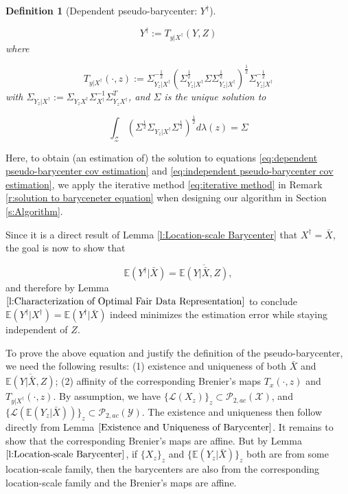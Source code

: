 \documentclass[twoside,11pt]{article}
\newtheorem{defi}{Definition}[section]{\bfseries}{\itshape}
\begin{document}
\begin{defi}[Dependent pseudo-barycenter: $Y^{\dag}$] \label{d:Dependent Pseudo-barycenter}

\begin{equation}\label{eq:dependent pseudo-barycenter }
Y^{\dag} := T_{y|X^{\dagger}}(Y,Z)
\end{equation}
where

\begin{equation}\label{eq:dependent pseudo-barycenter affine map}
T_{y|X^{\dagger}}(\cdot,z) :=  \Sigma_{Y_z|X^{\dagger}}^{-\frac{1}{2}} (\Sigma_{Y_z|X^{\dagger}}^{\frac{1}{2}} \Sigma \Sigma_{Y_z|X^{\dagger}}^{\frac{1}{2}} )^{\frac{1}{2}} \Sigma_{Y_z|X^{\dagger}}^{-\frac{1}{2}}
\end{equation}
with $\Sigma_{Y_z|X^{\dagger}} := \Sigma_{Y_z X^{\dagger}} \Sigma_{X^{\dagger}}^{-1} \Sigma_{Y_z X^{\dagger}}^T$, and $\Sigma$ is the unique solution to

\begin{equation} \label{eq:dependent pseudo-barycenter cov estimation}
\int_{\mathcal{Z}} (\Sigma^{\frac{1}{2}} \Sigma_{Y_z|X^{\dagger}} \Sigma^{\frac{1}{2}})^{\frac{1}{2}} d\lambda(z) = \Sigma
\end{equation}

\end{defi}


Here, to obtain (an estimation of) the solution to equations \eqref{eq:dependent pseudo-barycenter cov estimation} and \eqref{eq:independent pseudo-barycenter cov estimation}, we apply the iterative method \eqref{eq:iterative method} in Remark \ref{r:solution to baryceneter equation} when designing our algorithm in Section \ref{s:Algorithm}.

Since it is a direct result of Lemma \ref{l:Location-scale Barycenter} that $X^{\dag} = \bar{X}$, the goal is now to show that

\begin{equation}
\mathbb{E}(Y^{\dag}|\bar{X}) = \overline{\mathbb{E}(Y|\bar{X},Z)},
\end{equation}
and therefore by Lemma $\ref{l:Characterization of Optimal Fair Data Representation}$ to conclude $\mathbb{E}(Y^{\dag}|X^{\dag}) = \mathbb{E}(Y^{\dag}|\bar{X})$ indeed minimizes the estimation error while staying independent of $Z$.

To prove the above equation and justify the definition of the pseudo-barycenter, we need the following results: (1) existence and uniqueness of both $\bar{X}$ and $\overline{\mathbb{E}(Y|\bar{X},Z)}$; (2) affinity of the corresponding Brenier's maps $T_x(\cdot,z)$ and $T_{y|X^{\dagger}}(\cdot,z)$. By assumption, we have $\{\mathcal{L}(X_z)\}_z \subset \mathcal{P}_{2,ac}(\mathcal{X})$, and $\{\mathcal{L}(\mathbb{E}(Y_z|\bar{X}))\}_z \subset \mathcal{P}_{2,ac}(\mathcal{Y})$. The existence and uniqueness then follow directly from Lemma $\ref{Existence and Uniqueness of Barycenter}$. It remains to show that the corresponding Brenier's maps are affine. But by Lemma $\ref{l:Location-scale Barycenter}$, if $\{X_z\}_z$ and $\{\mathbb{E}(Y_z|\bar{X})\}_z$ both are from some location-scale family, then the barycenters are also from the corresponding location-scale family and the Brenier's maps are affine.
\end{document}
